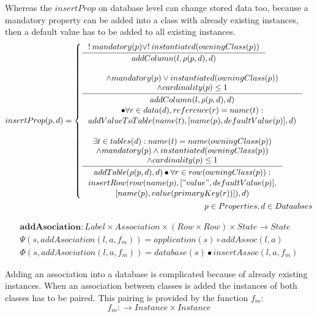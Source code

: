 \documentclass[11pt]{article}
\begin{document}
Whereas the $insertProp$ on database level can change stored data too, because a mandatory property can be added into a class with already existing instances, then a default value has to be added to all existing instances.
\begin{align*}
insertProp(p, d) = \begin{cases}
\inference{!\:mandatory(p) \vee !\:instantiated(owningClass(p))}{addColumn(l, \rho(p,d), d)} 
\\ \\ 
\inference{ \wedge mandatory(p) \vee instantiated(owningClass(p)) \\ \wedge cardinality(p) \leq 1}{\begin{gathered} addColumn(l, \rho(p,d), d) \\ \bullet \forall r \in data(d), reference(r) = name(t) : \\ addValueToTable(name(t), [name(p), defaultValue(p)], d)
\end{gathered}
} 
\\ \\
\inference{ \exists t \in tables(d) : name(t) = name(owningClass(p)) \\ \wedge mandatory(p) \wedge instantiated(owningClass(p)) \\ \wedge cardinality(p) \leq 1}{\begin{gathered}
addTable(\rho(p,d), d) \bullet \forall r \in row(owningClass(p)) :\\ insertRow(row(name(p), ["value", defaultValue(p)], \\ [name(p), value(primaryKey(r))]),d) 
\end{gathered}
} 
\end{cases}\\
p \in Properties, d \in Dataabses
\end{align*}

\begin{align*}
\mathbf{addAsociation} : Label \times Association \times (Row \times Row) \times State \rightarrow State \\
\Psi(s, addAsociation(l, a, f_m)) = application(s) \circ addAssoc(l, a) \\
\Phi(s, addAsociation(l, a, f_m)) = database(s) \bullet insertAssoc(l, a, f_m)
\end{align*}

Adding an association into a database is complicated because of already existing instances. When an association between classes is added the instances of both classes has to be paired. This pairing is provided by the function $f_m$:
$$f_m : \rightarrow Instance \times Instance $$
\end{document}
